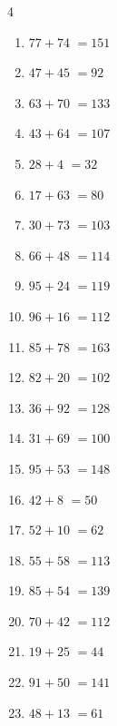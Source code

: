 \begin{multicols}{4}
\begin{enumerate}
  \item $77+74$
        $=151$

  \item $47+45$
        $=92$

  \item $63+70$
        $=133$

  \item $43+64$
        $=107$

  \item $28+4$
        $=32$

  \item $17+63$
        $=80$

  \item $30+73$
        $=103$

  \item $66+48$
        $=114$

  \item $95+24$
        $=119$

  \item $96+16$
        $=112$

  \item $85+78$
        $=163$

  \item $82+20$
        $=102$

  \item $36+92$
        $=128$

  \item $31+69$
        $=100$

  \item $95+53$
        $=148$

  \item $42+8$
        $=50$

  \item $52+10$
        $=62$

\columnbreak %

  \item $55+58$
        $=113$

  \item $85+54$
        $=139$

  \item $70+42$
        $=112$

  \item $19+25$
        $=44$

  \item $91+50$
        $=141$

  \item $48+13$
        $=61$


\end{enumerate}
\end{multicols}
